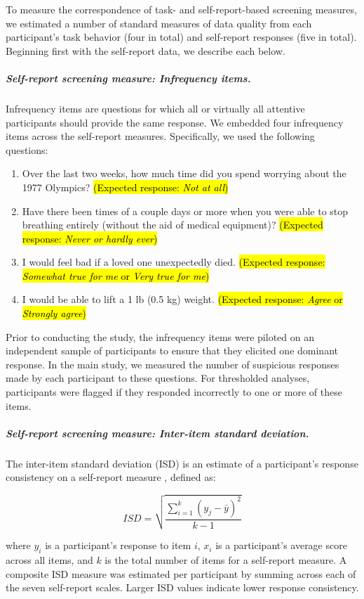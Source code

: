 \documentclass[a4paper,notitlepage,12pt]{article}
\begin{document}
\begin{refsection}[main]
To measure the correspondence of task- and self-report-based screening measures, we estimated a number of standard measures of data quality from each participant's task behavior (four in total) and self-report responses (five in total). Beginning first with the self-report data, we describe each below.

\subparagraph{Self-report screening measure: Infrequency items.} Infrequency items are questions for which all or virtually all attentive participants should provide the same response. We embedded four infrequency items across the self-report measures. Specifically, we used the following questions:

\begin{enumerate}
  \item Over the last two weeks, how much time did you spend worrying about the 1977 Olympics? \hl{(Expected response: \textit{Not at all})}
  \item Have there been times of a couple days or more when you were able to stop breathing entirely (without the aid of medical equipment)? \hl{(Expected response: \textit{Never or hardly ever})}
  \item I would feel bad if a loved one unexpectedly died. \hl{(Expected response: \textit{Somewhat true for me} or \textit{Very true for me})}
  \item I would be able to lift a 1 lb (0.5 kg) weight. \hl{(Expected response: \textit{Agree} or \textit{Strongly agree})}
\end{enumerate}

Prior to conducting the study, the infrequency items were piloted on an independent sample of participants to ensure that they elicited one dominant response. In the main study, we measured the number of suspicious responses made by each participant to these questions. For thresholded analyses, participants were flagged if they responded incorrectly to one or more of these items.

\subparagraph{Self-report screening measure: Inter-item standard deviation.} The inter-item standard deviation (ISD) is an estimate of a participant's response consistency on a self-report measure \cite{marjanovic2015inter}, defined as:

\begin{equation*}
    ISD = \sqrt{\frac{\sum^k_{i=1}(y_j - \bar{y})^2}{k-1}}
\end{equation*}

where $y_i$ is a participant's response to item $i$, $x_i$ is a participant's average score across all  items, and $k$ is the total number of items for a self-report measure. A composite ISD measure was estimated per participant by summing across each of the seven self-report scales. Larger ISD values indicate lower response consistency.


\end{refsection}
\end{document}
